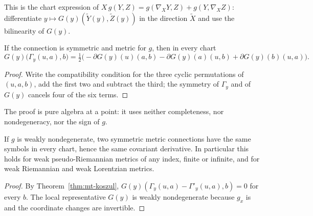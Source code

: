 This is the chart expression of $X\, g(Y, Z) = g(\nabla_X Y, Z) + g(Y, \nabla_X Z)$: differentiate
$y \mapsto G(y)(\tilde Y(y), \tilde Z(y))$ in the direction $\tilde X$ and use the bilinearity of
$G(y)$.

\begin{theorem}
  \label{thm:mt-koszul}
  \leanok
  If the connection is symmetric and metric for $g$, then in every chart
  \[
    G(y)\bigl(\Gamma_y(u, a), b\bigr) = \tfrac12 \bigl(-\partial G(y)(u)(a, b) - \partial G(y)(a)(u, b)
      + \partial G(y)(b)(u, a)\bigr).
  \]
\end{theorem}

\begin{proof}
  \leanok
  Write the compatibility condition for the three cyclic permutations of $(u, a, b)$, add the first
  two and subtract the third; the symmetry of $\Gamma_y$ and of $G(y)$ cancels four of the six
  terms.
\end{proof}

The proof is pure algebra at a point: it uses neither completeness, nor nondegeneracy, nor the
sign of $g$.

\begin{theorem}
  \label{thm:mt-lc-unique}
  \leanok
  If $g$ is weakly nondegenerate, two symmetric metric connections have the same symbols in every
  chart, hence the same covariant derivative. In particular this holds for weak pseudo-Riemannian
  metrics of any index, finite or infinite, and for weak Riemannian and weak Lorentzian metrics.
\end{theorem}

\begin{proof}
  \leanok
  By Theorem~\ref{thm:mt-koszul}, $G(y)(\Gamma_y(u, a) - \Gamma'_y(u, a), b) = 0$ for every $b$.
  The local representative $G(y)$ is weakly nondegenerate because $g_x$ is and the coordinate
  changes are invertible.
\end{proof}

